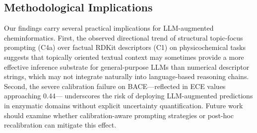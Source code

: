 \subsection{Methodological Implications}
Our findings carry several practical implications for 
LLM-augmented cheminformatics. First, the observed 
directional trend of structural topic-focus prompting (C4a) over 
factual RDKit descriptors (C1) on physicochemical tasks 
suggests that topically oriented textual context may 
sometimes provide a more effective inference substrate for 
general-purpose LLMs than numerical descriptor strings, 
which may not integrate naturally into language-based 
reasoning chains. Second, the severe calibration failure 
on BACE---reflected in ECE values approaching 0.44---
underscores the risk of deploying LLM-augmented 
predictions in enzymatic domains without explicit 
uncertainty quantification. Future work should examine 
whether calibration-aware prompting strategies or 
post-hoc recalibration can mitigate this effect.
